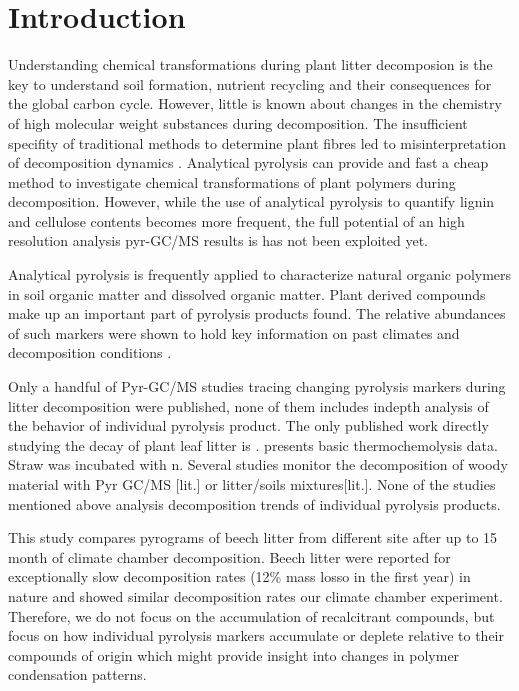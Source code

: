 \documentclass[preprint,review,12pt]{elsarticle}
\begin{document}
\section{Introduction}

Understanding chemical transformations during plant litter decomposion is the key to understand soil formation, nutrient recycling and their consequences for the global carbon cycle\citep{Prescott2010}. However, little is known about changes in the chemistry of high molecular weight substances during decomposition. The insufficient specifity of traditional methods to determine plant fibres\citep{Hatfield2005} led to misinterpretation of decomposition dynamics \citep{Klotzbucher2011}. Analytical pyrolysis can provide and fast a cheap method to investigate chemical transformations of plant polymers during decomposition. However, while the use of analytical pyrolysis to quantify lignin and cellulose contents becomes more frequent, the full potential of an high resolution analysis pyr-GC/MS results is has not been exploited yet.

Analytical pyrolysis is frequently applied to characterize natural organic polymers in soil organic matter and dissolved organic matter. Plant derived compounds make up an important part of pyrolysis products found. The relative abundances of such markers were shown to hold key information on past climates and decomposition conditions \cite{Kuder1998, Schellekens2009, Schellekens2011}.

Only a handful of Pyr-GC/MS studies tracing changing pyrolysis markers during litter decomposition were published, none of them includes indepth analysis of the behavior of individual pyrolysis product. The only published work directly studying the decay of plant leaf litter is \cite{Franchini2002}. \cite{Snajdr2010} presents basic thermochemolysis data.  Straw was incubated with n. Several studies monitor the decomposition of woody material with Pyr GC/MS [lit.] or litter/soils mixtures[lit.]. None of the studies mentioned above analysis decomposition trends of individual pyrolysis products.


This study compares pyrograms of beech litter from different site after up to 15 month of climate chamber decomposition. Beech litter were reported for exceptionally slow decomposition rates (12\% mass losso in the first year) in nature \citep{Klotzbucher2007} and showed similar decomposition rates our climate chamber experiment. Therefore, we do not focus on the accumulation of recalcitrant compounds, but focus on how individual pyrolysis markers accumulate or deplete relative to their compounds of origin which might provide insight into changes in polymer condensation patterns.
\end{document}
